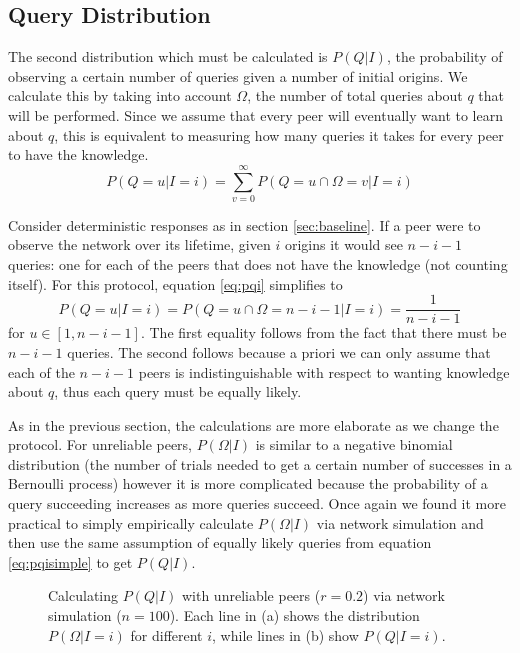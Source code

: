 \documentclass{article}
\newcommand{\eqnref}[1]{equation \eqref{eq:#1}}
\newcommand{\secref}[1]{section \ref{sec:#1}}
\begin{document}
\subsection{Query Distribution}\label{sec:qgiveni}

The second distribution which must be calculated is $P(Q|I)$, the probability of
observing a certain number of queries given a number of initial origins. We
calculate this by taking into account $\Omega$, the number of total queries
about $q$ that will be performed. Since we assume that every peer will
eventually want to learn about $q$, this is equivalent to measuring how many
queries it takes for every peer to have the knowledge.
\begin{equation}\label{eq:pqi}
	P(Q=u|I=i)=\sum_{v=0}^\infty P(Q=u\cap\Omega=v|I=i)
\end{equation}

Consider deterministic responses as in \secref{baseline}. If a peer were to
observe the network over its lifetime, given $i$ origins it would see $n-i-1$
queries: one for each of the peers that does not have the knowledge (not
counting itself). For this protocol, \eqnref{pqi} simplifies to
\begin{equation}\label{eq:pqisimple}
	P(Q=u|I=i)=P(Q=u\cap\Omega=n-i-1|I=i)=\frac{1}{n-i-1}
\end{equation}
for $u\in[1,n-i-1]$. The first equality follows from the fact that there must be
$n-i-1$ queries. The second follows because a priori we can only assume that
each of the $n-i-1$ peers is indistinguishable with respect to wanting knowledge
about $q$, thus each query must be equally likely.

As in the previous section, the calculations are more elaborate as we change the
protocol. For unreliable peers, $P(\Omega|I)$ is similar to a negative binomial
distribution (the number of trials needed to get a certain number of successes
in a Bernoulli process) however it is more complicated because the probability
of a query succeeding increases as more queries succeed. Once again we found it
more practical to simply empirically calculate $P(\Omega|I)$ via network
simulation and then use the same assumption of equally likely queries from
\eqnref{pqisimple} to get $P(Q|I)$.


\begin{figure}%
    \centering
	\caption{Calculating $P(Q|I)$ with unreliable peers ($r=0.2$) via network
	simulation ($n=100$). Each line in (a) shows the distribution
	$P(\Omega|I=i)$ for different $i$, while lines in (b) show $P(Q|I=i)$.}
    \label{fig:unrelqueries}%
\end{figure}
\end{document}
